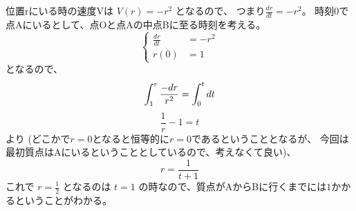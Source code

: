 \documentclass[12pt,a4]{article}
\begin{document}
位置rにいる時の速度Vは $ V(r) = - r^2 $ となるので、
つまり$ \frac{dr}{dt} = - r^2 $。
時刻0で点Aにいるとして、点Oと点Aの中点Bに至る時刻を考える。
\begin{equation}
  \left\{
  \begin{aligned}
    \frac{dr}{dt} & = - r^2 \\
    r(0) & = 1
  \end{aligned}
  \right.
\end{equation}
となるので、
\begin{equation}
  \int_1^r \frac{-dr}{r^2} = \int_0^t dt \\
\end{equation}
\begin{equation}
  \frac{1}{r} - 1 = t
\end{equation}
より
(どこかで$r=0$となると恒等的に$r=0$であるということとなるが、
今回は最初質点はAにいるということとしているので、考えなくて良い)、
\begin{equation}
  r = \frac{1}{t+1}
\end{equation}
これで $ r = \frac{1}{2} $ となるのは $ t = 1 $ の時なので、質点がAからBに行くまでには$1$かかるということがわかる。
\end{document}
